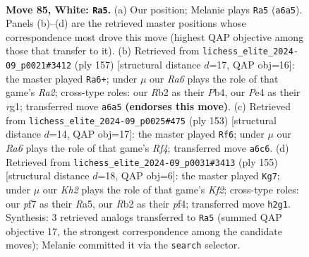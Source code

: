 \documentclass[11pt]{article}
\begin{document}
\clearpage

\begin{figure}[p]\centering
\begin{subfigure}{0.46\textwidth}\centering
\resizebox{\linewidth}{!}{%
\newchessgame
\chessboard[
  setfen={2r5/5pk1/R3p3/8/P3P3/5P2/1R5K/8 w - - 61 85},
  showmover=false,
  pgfstyle=straightmove, color=movearrow, markmove={a6-a5}
]}
\caption{}
\end{subfigure}\hfill
\begin{subfigure}{0.46\textwidth}\centering
\resizebox{\linewidth}{!}{%
\newchessgame
\chessboard[
  setfen={8/r4P1k/4K3/7p/pp3P2/8/8/6R1 b - - 9 79},
  showmover=false,
  pgfstyle=straightmove, color=movearrow, markmove={a7-a6}
]}
\caption{}
\end{subfigure}
\\[4pt]
\begin{subfigure}{0.46\textwidth}\centering
\resizebox{\linewidth}{!}{%
\newchessgame
\chessboard[
  setfen={8/6k1/R7/5r1p/6p1/6P1/5P2/6K1 b - - 47 77},
  showmover=false,
  pgfstyle=straightmove, color=movearrow, markmove={f5-f6}
]}
\caption{}
\end{subfigure}\hfill
\begin{subfigure}{0.46\textwidth}\centering
\resizebox{\linewidth}{!}{%
\newchessgame
\chessboard[
  setfen={8/5k2/7R/r6p/5Pp1/6P1/6K1/8 b - - 8 78},
  showmover=false,
  pgfstyle=straightmove, color=movearrow, markmove={f7-g7}
]}
\caption{}
\end{subfigure}
\caption{\textbf{Move 85, White: \texttt{Ra5}.} (a) Our position; Melanie plays \texttt{Ra5} (\texttt{a6a5}). Panels (b)--(d) are the retrieved master positions whose correspondence most drove this move (highest QAP objective among those that transfer to it). (b) Retrieved from \texttt{lichess\_elite\_2024-09\_p0021\#3412} (ply 157) [structural distance $d$=17, QAP obj=16]: the master played \texttt{Ra6+}; under $\mu$ our \emph{Ra6} plays the role of that game's \emph{Ra2}; cross-type roles: our \emph{R}b2 as their \emph{P}b4, our \emph{P}e4 as their \emph{r}g1; transferred move \texttt{a6a5} \textbf{(endorses this move)}. (c) Retrieved from \texttt{lichess\_elite\_2024-09\_p0025\#475} (ply 153) [structural distance $d$=14, QAP obj=17]: the master played \texttt{Rf6}; under $\mu$ our \emph{Ra6} plays the role of that game's \emph{Rf4}; transferred move \texttt{a6c6}. (d) Retrieved from \texttt{lichess\_elite\_2024-09\_p0031\#3413} (ply 155) [structural distance $d$=18, QAP obj=6]: the master played \texttt{Kg7}; under $\mu$ our \emph{Kh2} plays the role of that game's \emph{Kf2}; cross-type roles: our \emph{p}f7 as their \emph{R}a5, our \emph{R}b2 as their \emph{p}f4; transferred move \texttt{h2g1}. Synthesis: 3 retrieved analogs transferred to \texttt{Ra5} (summed QAP objective 17, the strongest correspondence among the candidate moves); Melanie committed it via the \texttt{search} selector.}
\label{fig:thought-m168}
\end{figure}
\end{document}
